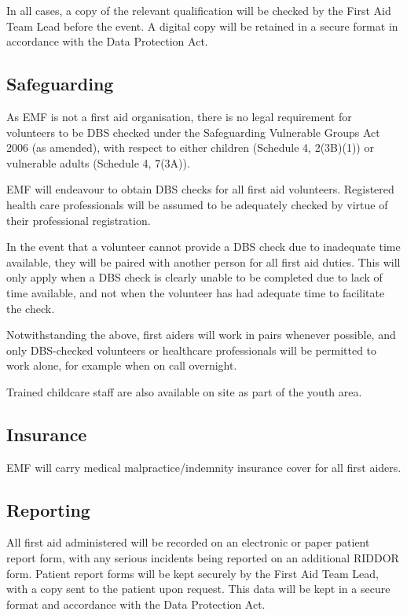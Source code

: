 In all cases, a copy of the relevant qualification will be checked by the
First Aid Team Lead before the event. A digital copy will be retained in a
secure format in accordance with the Data Protection Act.

\subsection{Safeguarding}

As EMF is not a first aid organisation, there is no legal requirement for
volunteers to be DBS checked under the Safeguarding Vulnerable Groups Act 2006
(as amended), with respect to either children (Schedule 4, 2(3B)(1)) or vulnerable
adults (Schedule 4, 7(3A)).

EMF will endeavour to obtain DBS checks for all first aid volunteers. Registered
health care professionals will be assumed to be adequately checked by virtue of
their professional registration.

In the event that a volunteer cannot provide a DBS check due to inadequate time
available, they will be paired with another person for all first aid duties.
This will only apply when a DBS check is clearly unable to be completed due to
lack of time available, and not when the volunteer has had adequate time to
facilitate the check.

Notwithstanding the above, first aiders will work in pairs whenever possible, and
only DBS-checked volunteers or healthcare professionals will be permitted to work
alone, for example when on call overnight.

Trained childcare staff are also available on site as part of the youth area.

\subsection{Insurance}
EMF will carry medical malpractice/indemnity insurance cover for all first aiders.

\subsection{Reporting}
All first aid administered will be recorded on an electronic or paper
patient report form, with any serious incidents being reported on an
additional RIDDOR form. Patient report forms will be kept securely by the First
Aid Team Lead, with a copy sent to the patient upon request. This
data will be kept in a secure format and accordance with the Data Protection
Act.

